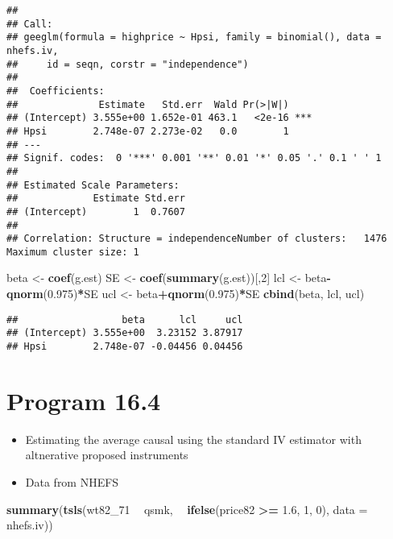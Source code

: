\documentclass[10pt,]{book}
\newenvironment{Shaded}{\begin{snugshade}}{\end{snugshade}}
\newcommand{\DataTypeTok}[1]{\textcolor[rgb]{0.13,0.29,0.53}{#1}}
\newcommand{\DecValTok}[1]{\textcolor[rgb]{0.00,0.00,0.81}{#1}}
\newcommand{\FloatTok}[1]{\textcolor[rgb]{0.00,0.00,0.81}{#1}}
\newcommand{\KeywordTok}[1]{\textcolor[rgb]{0.13,0.29,0.53}{\textbf{#1}}}
\newcommand{\NormalTok}[1]{#1}
\newcommand{\OperatorTok}[1]{\textcolor[rgb]{0.81,0.36,0.00}{\textbf{#1}}}
\newcommand{\StringTok}[1]{\textcolor[rgb]{0.31,0.60,0.02}{#1}}
\providecommand{\tightlist}{%
  \setlength{\itemsep}{0pt}\setlength{\parskip}{0pt}}
\begin{document}
\begin{verbatim}
## 
## Call:
## geeglm(formula = highprice ~ Hpsi, family = binomial(), data = nhefs.iv, 
##     id = seqn, corstr = "independence")
## 
##  Coefficients:
##              Estimate   Std.err  Wald Pr(>|W|)    
## (Intercept) 3.555e+00 1.652e-01 463.1   <2e-16 ***
## Hpsi        2.748e-07 2.273e-02   0.0        1    
## ---
## Signif. codes:  0 '***' 0.001 '**' 0.01 '*' 0.05 '.' 0.1 ' ' 1
## 
## Estimated Scale Parameters:
##             Estimate Std.err
## (Intercept)        1  0.7607
## 
## Correlation: Structure = independenceNumber of clusters:   1476   Maximum cluster size: 1
\end{verbatim}

\begin{Shaded}
\begin{Highlighting}[]
\NormalTok{beta <-}\StringTok{ }\KeywordTok{coef}\NormalTok{(g.est)}
\NormalTok{SE <-}\StringTok{ }\KeywordTok{coef}\NormalTok{(}\KeywordTok{summary}\NormalTok{(g.est))[,}\DecValTok{2}\NormalTok{]}
\NormalTok{lcl <-}\StringTok{ }\NormalTok{beta}\OperatorTok{-}\KeywordTok{qnorm}\NormalTok{(}\FloatTok{0.975}\NormalTok{)}\OperatorTok{*}\NormalTok{SE }
\NormalTok{ucl <-}\StringTok{ }\NormalTok{beta}\OperatorTok{+}\KeywordTok{qnorm}\NormalTok{(}\FloatTok{0.975}\NormalTok{)}\OperatorTok{*}\NormalTok{SE}
\KeywordTok{cbind}\NormalTok{(beta, lcl, ucl)}
\end{Highlighting}
\end{Shaded}

\begin{verbatim}
##                  beta      lcl     ucl
## (Intercept) 3.555e+00  3.23152 3.87917
## Hpsi        2.748e-07 -0.04456 0.04456
\end{verbatim}

\hypertarget{program-16.4}{%
\section{Program 16.4}\label{program-16.4}}

\begin{itemize}
\tightlist
\item
  Estimating the average causal using the standard IV estimator with altnerative proposed instruments
\item
  Data from NHEFS
\end{itemize}

\begin{Shaded}
\begin{Highlighting}[]
\KeywordTok{summary}\NormalTok{(}\KeywordTok{tsls}\NormalTok{(wt82_}\DecValTok{71} \OperatorTok{~}\StringTok{ }\NormalTok{qsmk, }\OperatorTok{~}\StringTok{ }\KeywordTok{ifelse}\NormalTok{(price82 }\OperatorTok{>=}\StringTok{ }\FloatTok{1.6}\NormalTok{, }\DecValTok{1}\NormalTok{, }\DecValTok{0}\NormalTok{), }\DataTypeTok{data =}\NormalTok{ nhefs.iv))}
\end{Highlighting}
\end{Shaded}
\end{document}
